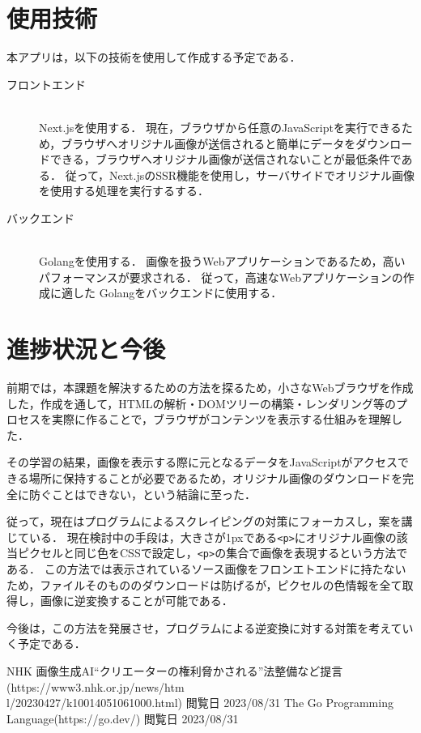 ﻿\documentclass[twocolumn,a4j]{jarticle}
\begin{document}
\section{使用技術}
本アプリは，以下の技術を使用して作成する予定である．
\begin{description}
  \item[フロントエンド]\mbox{}\\
  \quad Next.jsを使用する．
  現在，ブラウザから任意のJavaScriptを実行できるため，ブラウザへオリジナル画像が送信されると簡単にデータをダウンロードできる，ブラウザへオリジナル画像が送信されないことが最低条件である．
  従って，Next.jsのSSR機能を使用し，サーバサイドでオリジナル画像を使用する処理を実行するする．
  \item[バックエンド]\mbox{}\\
  \quad Golangを使用する．
  画像を扱うWebアプリケーションであるため，高いパフォーマンスが要求される．
  従って，高速なWebアプリケーションの作成に適した\cite{go} Golangをバックエンドに使用する．
\end{description}


\section{進捗状況と今後}
前期では，本課題を解決するための方法を探るため，小さなWebブラウザを作成した，作成を通して，HTMLの解析・DOMツリーの構築・レンダリング等のプロセスを実際に作ることで，ブラウザがコンテンツを表示する仕組みを理解した．\par
その学習の結果，画像を表示する際に元となるデータをJavaScriptがアクセスできる場所に保持することが必要であるため，オリジナル画像のダウンロードを完全に防ぐことはできない，という結論に至った．\par
従って，現在はプログラムによるスクレイピングの対策にフォーカスし，案を講じている．
現在検討中の手段は，大きさが1pxである\lstinline!<p>!にオリジナル画像の該当ピクセルと同じ色をCSSで設定し，\lstinline|<p>|の集合で画像を表現するという方法である．
この方法では表示されているソース画像をフロンエトエンドに持たないため，ファイルそのもののダウンロードは防げるが，ピクセルの色情報を全て取得し，画像に逆変換することが可能である．\par
今後は，この方法を発展させ，プログラムによる逆変換に対する対策を考えていく予定である．


\begin{thebibliography}{9}\setlength{\itemsep}{-2pt}
   NHK 画像生成AI“クリエーターの権利脅かされる”法整備など提言(https://www3.nhk.or.jp/news/htm\\l/20230427/k10014051061000.html) 閲覧日 2023/08/31
   The Go Programming Language(https://go.dev/) 閲覧日 2023/08/31
\end{thebibliography}
\end{document}
